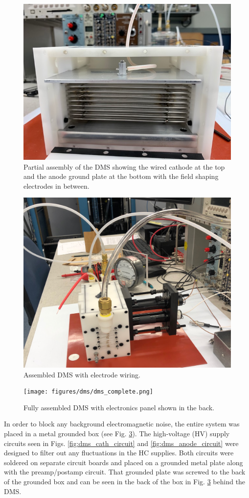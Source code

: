 \begin{figure}[H]
	\centering
	\includegraphics[width=0.75\linewidth]{figures/dms/const1.png}
	\caption{Partial assembly of the DMS showing the wired cathode at the top and the anode ground plate at the bottom with the field shaping electrodes in between.}
	\label{fig:dms_const1}
\end{figure}
\begin{figure}[H]
	\centering
	\includegraphics[width=0.75\linewidth]{figures/dms/const2.png}
	\caption{Assembled DMS with electrode wiring.}
	\label{fig:dms_const2}
\end{figure}
\begin{figure}[h!]
	\centering
	\texttt{[image: figures/dms/dms\_complete.png]}
	\caption{Fully assembled DMS with electronics panel shown in the back.}
	\label{fig:dms_const3}
\end{figure}

In order to block any background electromagnetic noise, the entire system was placed in a metal grounded box (see Fig. \ref{fig:dms_const3}). The high-voltage (HV) supply circuits seen in Figs. \ref{fig:dms_cath_circuit} and \ref{fig:dms_anode_circuit} were designed to filter out any fluctuations in the HC supplies. Both circuits were soldered on separate circuit boards and placed on a grounded metal plate along with the preamp/postamp circuit. That grounded plate was screwed to the back of the grounded box and can be seen in the back of the box in Fig. \ref{fig:dms_const3} behind the DMS.

